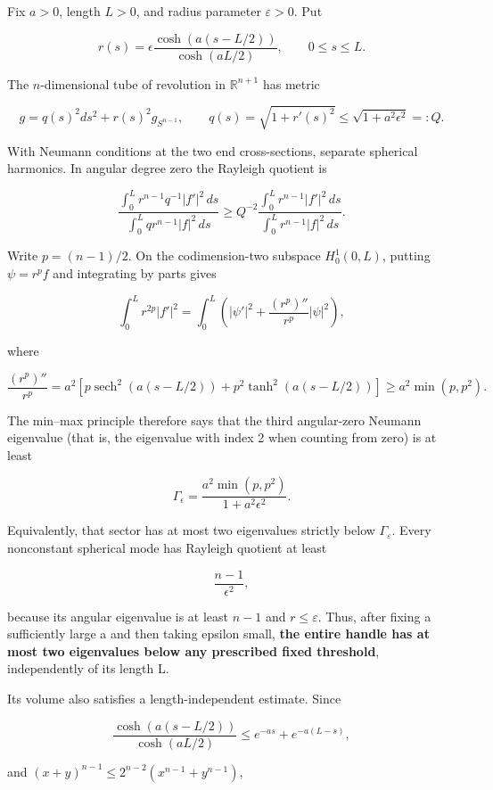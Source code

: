 \documentclass[11pt,a4paper]{article}
\begin{document}
Fix \(a>0\), length \(L>0\), and radius parameter \(\varepsilon >0\).
Put

\[
 r(s)=\epsilon\frac{\cosh(a(s-L/2))}{\cosh(aL/2)},\qquad0\le s\le L.
\]

The \(n\)-dimensional tube of revolution in \(\mathbb R^{n+1}\) has
metric

\[
 g=q(s)^2 ds^2+r(s)^2g_{S^{n-1}},\qquad
 q(s)=\sqrt{1+r'(s)^2}\le\sqrt{1+a^2\epsilon^2}=:Q.
\]

With Neumann conditions at the two end cross-sections, separate
spherical harmonics. In angular degree zero the Rayleigh quotient is

\[
 \frac{\int_0^L r^{n-1}q^{-1}|f'|^2\,ds}
      {\int_0^L qr^{n-1}|f|^2\,ds}
 \ge Q^{-2}
 \frac{\int_0^L r^{n-1}|f'|^2\,ds}
      {\int_0^L r^{n-1}|f|^2\,ds}.
 \tag{A1}
\]

Write \(p=(n-1)/2\). On the codimension-two subspace \(H^1_0(0,L)\),
putting \(\psi =r^p f\) and integrating by parts gives

\[
 \int_0^Lr^{2p}|f'|^2
 =\int_0^L\left(|\psi'|^2+
       \frac{(r^p)''}{r^p}|\psi|^2\right),
\]

where

\[
 \frac{(r^p)''}{r^p}
  =a^2\left[p\operatorname{sech}^2(a(s-L/2))
              +p^2\tanh^2(a(s-L/2))\right]
  \ge a^2\min(p,p^2).
 \tag{A2}
\]

The min--max principle therefore says that the third angular-zero
Neumann eigenvalue (that is, the eigenvalue with index 2 when counting
from zero) is at least

\[
 \Gamma_\epsilon=
 \frac{a^2\min(p,p^2)}{1+a^2\epsilon^2}.
 \tag{A3}
\]

Equivalently, that sector has at most two eigenvalues strictly below
\(\Gamma _\varepsilon\). Every nonconstant spherical mode has Rayleigh
quotient at least

\[
 \frac{n-1}{\epsilon^2},
 \tag{A4}
\]

because its angular eigenvalue is at least \(n-1\) and
\(r\le \varepsilon\). Thus, after fixing a sufficiently large a and then
taking epsilon small, \textbf{the entire handle has at most two
eigenvalues below any prescribed fixed threshold}, independently of its
length L.

Its volume also satisfies a length-independent estimate. Since

\[
 \frac{\cosh(a(s-L/2))}{\cosh(aL/2)}
 \le e^{-as}+e^{-a(L-s)},
\]

and \((x+y)^{n-1}\le 2^{n-2}(x^{n-1}+y^{n-1})\),
\end{document}
